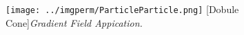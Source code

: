 \begin{figure}[H]
\centering
\texttt{[image: ../imgperm/ParticleParticle.png]}
[Dobule Cone]{\textit{Gradient Field Appication.}}
\label{fig:ParticleParticle}
\end{figure}
